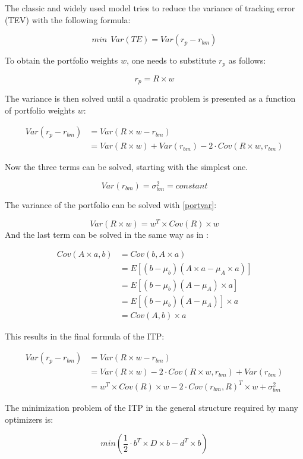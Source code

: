 \documentclass[
  oneside]{book}
\begin{document}
The classic and widely used model tries to reduce the variance of tracking error (TEV) with the following formula:

\[
 min \ \ Var(TE) = Var(r_{p}-r_{bm})
\]

To obtain the portfolio weights \(w\), one needs to substitute \(r_{p}\) as follows:

\[
  r_{p} = R \times w
\]

The variance is then solved until a quadratic problem is presented as a function of portfolio weights \(w\):

\begin{align*}
 Var(r_{p}-r_{bm}) &= Var(R \times w - r_{bm}) \\
 &= Var(R \times w) + Var(r_{bm}) - 2 \cdot Cov(R \times w,r_{bm}) 
\end{align*}

Now the three terms can be solved, starting with the simplest one.

\[
Var(r_{bm}) = \sigma_{bm}^2 = constant
\]

The variance of the portfolio can be solved with \ref{portvar}:

\[
Var(R \times w) = w^T \times Cov(R) \times w
\]
And the last term can be solved in the same way as in \citep{Eric2021}:

\begin{align*}
  Cov(A \times a, b) &= Cov(b, A \times a) \\
  &= E[(b-\mu_{b})(A \times a-\mu_{A} \times a)] \\
  &= E[(b-\mu_{b})(A-\mu_{A}) \times a] \\
  &= E[(b-\mu_{b})(A-\mu_{A})] \times a \\
  &= Cov(A,b) \times a
\end{align*}

This results in the final formula of the ITP:

\begin{align*}
  Var(r_{p}-r_{bm}) & = Var(R \times w - r_{bm}) \\
  & = Var(R \times w) - 2 \cdot Cov(R \times w,r_{bm}) + Var(r_{bm})  \\
  & = w^T \times Cov(R) \times w - 2 \cdot Cov(r_{bm}, R)^T \times w + \sigma_{bm}^2
  \label{eq:ITP}
\end{align*}

The minimization problem of the ITP in the general structure required by many optimizers is:

\[
  min(\frac{1}{2} \cdot b^T \times D \times b -d^T \times b)
\]
\end{document}

